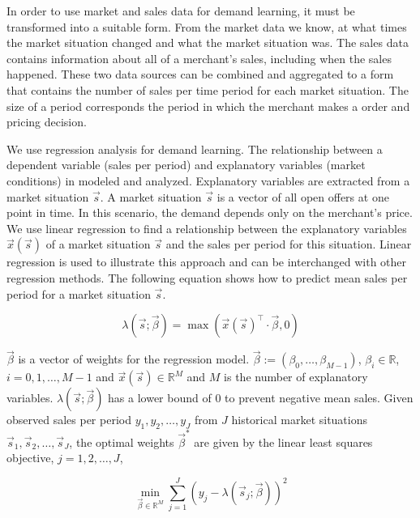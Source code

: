 In order to use market and sales data for demand learning, it must be transformed into a suitable form.
From the market data we know, at what times the market situation changed and what the market situation was.
The sales data contains information about all of a merchant's sales, including when the sales happened.
These two data sources can be combined and aggregated to a form that contains the number of sales per time period for each market situation.
The size of a period corresponds the period in which the merchant makes a order and pricing decision.

We use regression analysis for demand learning.
The relationship between a dependent variable (sales per period) and explanatory variables (market conditions) in modeled and analyzed.
Explanatory variables are extracted from a market situation $\vec{s}$.
A market situation $\vec{s}$ is a vector of all open offers at one point in time.
In this scenario, the demand depends only on the merchant's price.
We use linear regression to find a relationship between the explanatory variables $\vec{x}(\vec{s})$ of a market situation $\vec{s}$ and the sales per period for this situation.
Linear regression is used to illustrate this approach and can be interchanged with other regression methods.
The following equation shows how to predict mean sales per period for a market situation $\vec{s}$.

\begin{equation}
\label{eq:linear_regression}
\lambda(\vec{s}; \vec{\beta}) = \max(\vec{x}(\vec{s})^\intercal \cdot \vec{\beta}, 0)
\end{equation}

$\vec{\beta}$ is a vector of weights for the regression model.
$\vec{\beta} := (\beta_0, \ldots, \beta_{M-1})$, $\beta_i \in \mathbb{R}$, $i=0, 1, \ldots, M-1$ and $\vec{x}(\vec{s}) \in \mathbb{R}^M$ and $M$ is the number of explanatory variables.
$\lambda(\vec{s}; \vec{\beta})$ has a lower bound of 0 to prevent negative mean sales.
Given observed sales per period $y_1, y_2, \ldots, y_J$ from $J$ historical market situations $\vec{s}_1, \vec{s}_2, \ldots, \vec{s}_J$, the optimal weights $\vec{\beta}^*$ are given by the linear least squares objective, $j=1, 2, \ldots, J$,

\begin{equation}
 \min_{\vec{\beta} \in \mathbb{R}^M}{\sum_{j=1}^J
	{(y_j - \lambda(\vec{s}_j; \vec{\beta}))^2}
}
\label{eq:least_squares_objective}
\end{equation}

